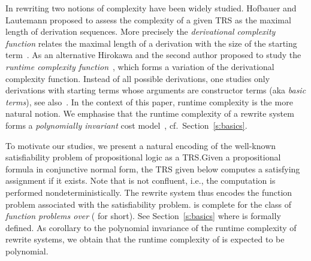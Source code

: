 \documentclass{LMCS}
\begin{document}
In rewriting two notions of complexity have been widely studied. 
Hofbauer and Lautemann proposed to assess the complexity of a given TRS 
as the maximal length of derivation sequences. More precisely
the \emph{derivational complexity function} relates the maximal length of a 
derivation with the size of the starting term~\cite{HL89}. 
As an alternative Hirokawa and the second author proposed to study the 
\emph{runtime complexity function}~\cite{HM08}, which forms a variation
of the derivational complexity function. Instead of all possible derivations,
one studies only derivations with starting terms whose arguments are constructor terms
(aka \emph{basic terms}), see also~\cite{BCMT01}.
In the context of this paper, runtime complexity is the more natural notion. 
We emphasise that the runtime complexity of a rewrite system
forms a \emph{polynomially invariant} cost model~\cite{Boas:TCS:90}, cf.~Section~\ref{s:basics}.

To motivate our studies, we present a natural encoding of
the well-known satisfiability problem  of propositional logic 
as a TRS.\@ Given a propositional formula in conjunctive normal form, 
the TRS  given below computes a satisfying assignment if it exists.
Note that  is not confluent, i.e., the computation is performed 
nondeterministically. 
The rewrite system  thus encodes 
the function problem \emph{} associated with the satisfiability
problem. 
 is complete for the class of \emph{function problems over } 
( for short). See Section~\ref{s:basics} where  is formally defined. 
As corollary to the polynomial invariance of
the runtime complexity of rewrite systems, we obtain that the runtime complexity
of  is expected to be polynomial.
\end{document}
